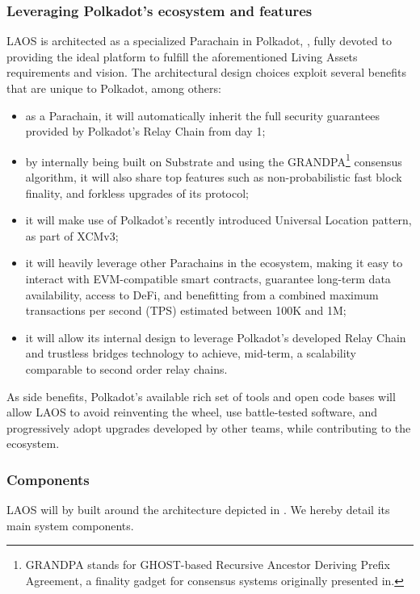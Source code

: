 \subsubsection{Leveraging Polkadot's ecosystem and features}

LAOS is architected as a specialized Parachain in Polkadot\cite{polkadot}, \cite{polkadotExplained},
fully devoted to providing the ideal platform to fulfill the aforementioned Living Assets requirements and vision.
The architectural design choices exploit several benefits that are unique to Polkadot, among others:
\begin{itemize}
    \item as a Parachain, it will automatically inherit the full security guarantees 
    provided by Polkadot's Relay Chain from day 1;
    \item by internally being built on Substrate and using the GRANDPA\footnote{GRANDPA stands for GHOST-based Recursive Ancestor Deriving Prefix Agreement, a finality gadget for consensus systems originally presented in\cite{grandpa}.}
    consensus algorithm, it will also share top features such as non-probabilistic
    fast block finality, and forkless upgrades of its protocol;
    \item it will make use of Polkadot's recently introduced Universal Location pattern, as part of XCMv3;
    \item it will heavily leverage other Parachains in the ecosystem, making it easy to interact
    with EVM-compatible smart contracts, guarantee long-term data availability, access to DeFi, and
    benefitting from a combined maximum transactions per second (TPS) estimated between 100K and 1M;
    \item it will allow its internal design to leverage Polkadot's developed Relay Chain 
    and trustless bridges technology to achieve, mid-term, a scalability comparable to second order relay chains.   
\end{itemize}

As side benefits, Polkadot's available rich set of tools and open code bases will
allow LAOS to avoid reinventing the wheel, use battle-tested software,
and progressively adopt upgrades developed by other teams, while contributing to the ecosystem.

\subsubsection{Components}

LAOS will by built around the architecture depicted in .
We hereby detail its main system components.

